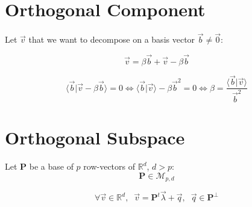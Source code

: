 \documentclass[aps,12pt]{revtex4}
\begin{document}
\section{Orthogonal Component}
Let $\vec{v}$ that we want to decompose on a basis vector $\vec{b} \not= \vec{0}$:

\begin{equation}
	\vec{v} = \beta \vec{b} + \vec{v} - \beta \vec{b}
\end{equation}

\begin{equation}
	\langle	\vec{b} \vert \vec{v} - \beta \vec{b}\rangle = 0 \iff \langle \vec{b} \vert \vec{v} \rangle - \beta \vec{b}^2 = 0
	\iff \beta = \dfrac{\langle \vec{b} \vert \vec{v} \rangle}{\vec{b}^2}
\end{equation}


\section{Orthogonal Subspace}

Let $\bm{P}$ be a base of $p$ row-vectors of $\mathbb{R}^d$, $d>p$:
\begin{equation}
	\bm{P} \in \mathcal{M}_{p,d}
\end{equation}

\begin{equation}
\forall \vec{v} \in \mathbb{R}^d,\;\; \vec{v} = \bm{P}^t \vec{\lambda} +  \vec{q}, \;\; \vec{q} \in \bm{P}^\perp
\end{equation}
\end{document}

